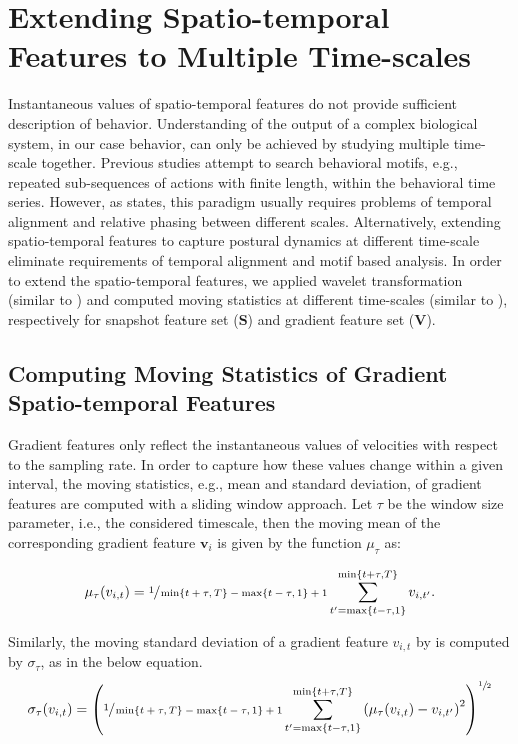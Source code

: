 \section{Extending Spatio-temporal Features to Multiple Time-scales}\label{section:extending-features-to-multiple-time-scale}
Instantaneous values of spatio-temporal features do not provide sufficient description of behavior.
Understanding of the output of a complex biological system, in our case behavior, can only be achieved by studying multiple time-scale together.
Previous studies attempt to search behavioral motifs, e.g., repeated sub-sequences of actions with finite length, within the behavioral time series.
However, as \citet{berman_mapping_2014} states, this paradigm usually requires problems of temporal alignment and relative phasing between different scales.
Alternatively, extending spatio-temporal features to capture postural dynamics at different time-scale eliminate requirements of temporal alignment and motif based analysis.
In order to extend the spatio-temporal features, we applied wavelet transformation (similar to \citet{berman_mapping_2014}) and computed moving statistics at different time-scales (similar to \citet{kabra_jaaba_2013}), respectively for snapshot feature set ($\mathbf{S}$) and gradient feature set ($\mathbf{V}$).

\subsection{Computing Moving Statistics of Gradient Spatio-temporal Features}
Gradient features only reflect the instantaneous values of velocities with respect to the sampling rate. In order to capture how these values change within a given interval, the moving statistics, e.g., mean and standard deviation, of gradient features are computed with a sliding window approach. Let $\tau$ be the window size parameter, i.e., the considered timescale, then the moving mean of the corresponding gradient feature $\mathbf{v}_{i}$ is given by the function $\mu_\tau$ as:

\begin{equation}
	\mu_{\tau}(v_{i,t}) = \sfrac{1}{\min\{t+\tau,T\}-\max\{t-\tau,1\}+1} \sum_{t^{\prime}=\max\{t-\tau,1\}}^{\min\{t+\tau,T\}} v_{i, t^{\prime}}.
\end{equation}

Similarly, the moving standard deviation of a gradient feature $v_{i,t}$ by is computed by $\sigma_\tau$, as in the below equation.
\begin{equation}
	\sigma_\tau(v_{i,t}) = \left(\sfrac{1}{\min\{t+\tau,T\}-\max\{t-\tau,1\}+1} \sum_{t^{\prime}=\max\{t-\tau,1\}}^{\min\{t+\tau,T\}} \left(\mu_{\tau}(v_{i,t}) - v_{i, t^{\prime}}\right)^2\right)^{\sfrac{1}{2}}
\end{equation}

